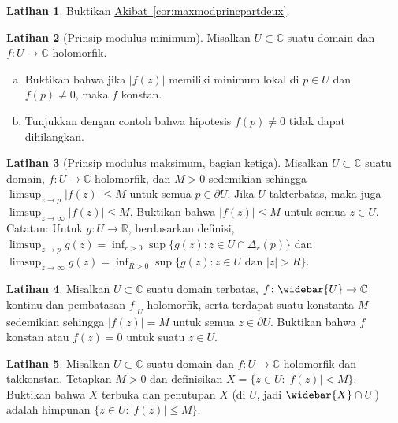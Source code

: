 \documentclass[12pt,openany]{book}
\newcommand{\sabs}[1]{\lvert {#1} \rvert}
\newcommand{\C}{{\mathbb{C}}}
\newcommand{\R}{{\mathbb{R}}}
\theoremstyle{plain}
\theoremstyle{remark}
\theoremstyle{definition}
\newenvironment{exbox}{%
    \def\FrameCommand{\vrule width 1pt \relax\hspace{10pt}}%
    \MakeFramed{\advance\hsize-\width\FrameRestore}%
}{%
    \endMakeFramed
}
\newenvironment{exparts}{%
    \leavevmode\begin{enumerate}[a),noitemsep,topsep=0pt,parsep=0pt,partopsep=0pt]
}{%
    \end{enumerate}
}
\theoremstyle{exercise}
\newtheorem{exercise}{Latihan}[section]
\theoremstyle{example}
\newcommand{\corref}[1]{\hyperref[#1]{Akibat~\ref*{#1}}}
\begin{document}
\begin{exbox}
\begin{exercise}
Buktikan \corref{cor:maxmodprincpartdeux}.
\end{exercise}

\begin{exercise}[Prinsip modulus minimum]
Misalkan $U \subset \C$ suatu domain dan
$f \colon U \to \C$ holomorfik.
\begin{exparts}
\item
Buktikan bahwa jika $\sabs{f(z)}$ memiliki minimum lokal di $p \in U$ dan $f(p) \neq 0$,
maka $f$ konstan.
\item
Tunjukkan dengan contoh bahwa hipotesis
$f(p) \neq 0$ tidak dapat dihilangkan.
\end{exparts}
\end{exercise}

\begin{exercise}[Prinsip modulus maksimum, bagian ketiga]
Misalkan $U \subset \C$ suatu domain, $f \colon U \to \C$ holomorfik,
dan $M > 0$ sedemikian sehingga
$\limsup_{z \to p} \sabs{f(z)} \leq M$ untuk semua $p \in \partial U$.
Jika $U$ takterbatas, maka juga 
$\limsup_{z \to \infty} \sabs{f(z)} \leq M$.  Buktikan bahwa
$\sabs{f(z)} \leq M$ untuk semua $z \in U$.
Catatan: Untuk $g \colon U \to \R$,
berdasarkan definisi,
$\limsup_{z\to p} g(z) = \inf_{r > 0} \sup \bigl\{ g(z) : z \in U
\cap \Delta_r(p) \bigr\}$ dan
$\limsup_{z\to \infty} g(z) = \inf_{R > 0} \sup \bigl\{ g(z) :
z \in U \text{ dan } \sabs{z} > R \bigr\}$.
\end{exercise}

\begin{exercise}
Misalkan $U \subset \C$ suatu domain terbatas,
$f \colon \widebar{U} \to \C$ kontinu dan pembatasan $f|_{U}$
holomorfik, serta terdapat suatu konstanta $M$ sedemikian sehingga $\sabs{f(z)} = M$
untuk semua $z \in \partial U$.  Buktikan bahwa $f$ konstan atau $f(z) = 0$
untuk suatu $z \in U$.
\end{exercise}

\begin{exercise}
Misalkan $U \subset \C$ suatu domain dan $f \colon U \to \C$ holomorfik
dan takkonstan.
Tetapkan $M > 0$ dan
definisikan $X = \bigl\{ z \in U : \sabs{f(z)} < M \bigr\}$.
Buktikan bahwa $X$ terbuka dan penutupan $X$ (di $U$, jadi $\widebar{X} \cap U$) adalah himpunan
$\bigl\{ z \in U : \sabs{f(z)} \leq M \bigr\}$.
\end{exercise}


\end{exbox}
\end{document}
